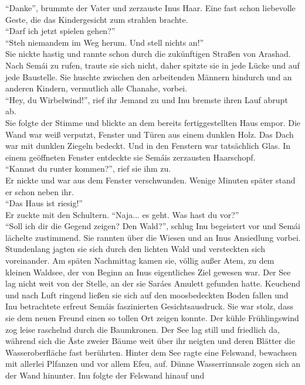 ``Danke'', brummte der Vater und zerzauste Inus Haar. Eine fast schon liebevolle Geste, die das 
Kindergesicht zum strahlen brachte. \\
``Darf ich jetzt spielen gehen?''\\
``Steh niemandem im Weg herum. Und stell nichts an!''\\
Sie nickte hastig und rannte schon durch die zukünftigen Straßen von Arashad. Nach Semái zu rufen, 
traute sie sich nicht, daher spitzte sie in jede Lücke und auf jede Baustelle. Sie huschte zwischen 
den arbeitenden Männern hindurch und an anderen Kindern, vermutlich alle Chanahe, vorbei. \\
``Hey, du Wirbelwind!'', rief ihr Jemand zu und Inu bremste ihren Lauf abrupt ab. \\
Sie folgte der Stimme und blickte an dem bereits fertiggestellten Haus empor. Die Wand war weiß 
verputzt, Fenster und Türen aus einem dunklen Holz. Das Dach war mit dunklen Ziegeln bedeckt. Und 
in den Fenstern war tatsächlich Glas. In einem geöffneten Fenster entdeckte sie Semáis zerzausten 
Haarschopf. \\
``Kannst du runter kommen?'', rief sie ihm zu. \\
Er nickte und war aus dem Fenster verschwunden. Wenige Minuten später stand er schon neben ihr. \\
``Das Haus ist riesig!''\\
Er zuckte mit den Schultern. ``Naja... es geht. Was hast du vor?''\\
``Soll ich dir die Gegend zeigen? Den Wald?'', schlug Inu begeistert vor und Semái lächelte 
zustimmend. 
Sie rannten über die Wiesen und an Inus Ansiedlung vorbei. Stundenlang jagten sie sich durch den 
lichten Wald und versteckten sich voreinander. Am späten Nachmittag kamen sie, völlig außer Atem, 
zu dem kleinen Waldsee, der von Beginn an Inus eigentliches Ziel gewesen war. Der See lag nicht 
weit von der Stelle, an der sie Saráes Amulett gefunden hatte. Keuchend und nach Luft ringend 
ließen sie sich auf den moosbedeckten Boden fallen und Inu betrachtete erfreut Semáis faszinierten 
Gesichtsausdruck. Sie war stolz, dass sie dem neuen Freund einen so tollen Ort zeigen konnte. 
Der kühle Frühlingswind zog leise raschelnd durch die Baumkronen. Der See lag still und friedlich 
da, während sich die Äste zweier Bäume weit über ihr neigten und deren Blätter die Wasseroberfläche 
fast berührten. Hinter dem See ragte eine Felswand, bewachsen mit allerlei Plfanzen und vor allem 
Efeu, auf. Dünne Wasserrinnsale zogen sich an der Wand hinunter. Inu folgte der Felswand hinauf und 
